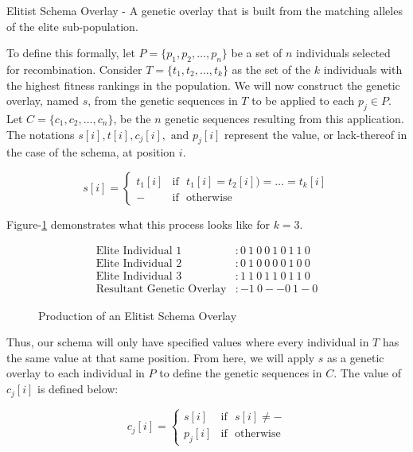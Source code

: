 \begin{overlay}
Elitist Schema Overlay - A genetic overlay that is built from the matching alleles of the elite sub-population.
\end{overlay}

To define this formally, let $P = \{p_1,p_2,\ldots,p_n\}$ be a set of $n$ individuals selected for recombination. Consider $T=\{t_1,t_2,\ldots,t_k\}$ as the set of the $k$ individuals with the highest fitness rankings in the population. We will now construct the genetic overlay, named $s$, from the genetic sequences in $T$ to be applied to each $p_j \in P$. Let $C = \{c_1,c_2,\ldots,c_n\}$, be the $n$ genetic sequences resulting from this application. The notations $s[i], t[i], c_j[i], \text{ and } p_j[i]$ represent the value, or lack-thereof in the case of the schema, at position $i$. 
 
 \begin{displaymath}
   s[i] = \left\{
     \begin{array}{cl}
       t_1[i] & \text{if~ } t_1[i] = t_2[i]) = \ldots = t_k[i] \\
       - & \text{if~ } \text{otherwise} 
     \end{array}
   \right.
\end{displaymath} 

Figure-\ref{ESO-Fig} demonstrates what this process looks like for $k = 3$.

\begin{figure}[h!]
\centering 
\begin{align*}
\text{Elite Individual 1} &: 0~1~0~0~1~0~1~1~0 			\\
\text{Elite Individual 2} &: 0~1~0~0~0~0~1~0~0 			\\
\text{Elite Individual 3} &: 1~1~0~1~1~0~1~1~0 			\\  
\text{Resultant Genetic Overlay} &:   -1~0--0~1-0			
\end{align*}
\caption{Production of an Elitist Schema Overlay}
\label{ESO-Fig}
\end{figure}

Thus, our schema will only have specified values where every individual in $T$ has the same value at that same position. From here, we will apply $s$ as a genetic overlay to each individual in $P$ to define the genetic sequences in $C$. The value of $c_j[i]$ is defined below:

 \begin{displaymath}
   c_j[i] = \left\{
     \begin{array}{cl}
       s[i] & \text{if~ } s[i] \not= - \\
       p_j[i] & \text{if~ } \text{otherwise} 
     \end{array}
   \right.
\end{displaymath} 

